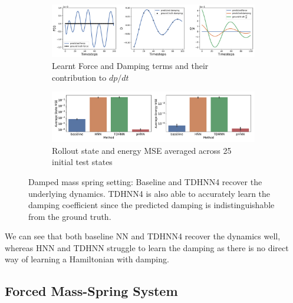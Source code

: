 \documentclass[twoside]{article}
\begin{document}
\begin{figure}[h!]
\centering
\captionsetup{justification=centering}
	\begin{subfigure}[b]{0.48\textwidth}
		\centering
		\includegraphics[width=\textwidth]{figures/figures/damped/1/damped_dpdt_0.pdf}
		\caption{Learnt Force and Damping terms and their contribution to $dp/dt$}
	\end{subfigure}
	\begin{subfigure}[b]{0.48\textwidth}
	    \centering
		\includegraphics[width=\textwidth]{figures/figures/damped/1/damped_errors_0.pdf}
		\caption{Rollout state and energy MSE averaged across 25 initial test states}
	\end{subfigure}
\caption{Damped mass spring setting: Baseline and TDHNN4 recover the underlying dynamics. TDHNN4 is also able to accurately learn the damping coefficient since the predicted damping is indistinguishable from the ground truth.}
\label{damped}
\end{figure}

We can see that both baseline NN and TDHNN4 recover the dynamics well, whereas HNN and TDHNN struggle to learn the damping as there is no direct way of learning a Hamiltonian with damping.

\subsection{Forced Mass-Spring System}
\end{document}
